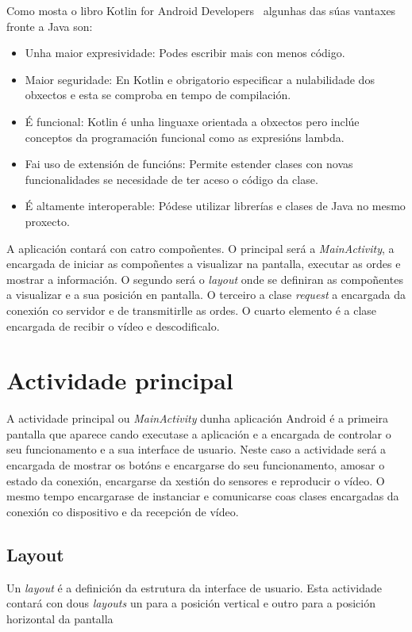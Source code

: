 Como mosta o libro Kotlin for Android Developers~\cite{leivaKotlinAndroidDevelopers2018} algunhas das súas vantaxes fronte a Java son:
\begin{itemize}
    \item Unha maior expresividade: Podes escribir mais con menos código.
    \item Maior seguridade: En Kotlin e obrigatorio especificar a nulabilidade dos obxectos e esta se comproba en tempo de compilación.
    \item É funcional: Kotlin é unha linguaxe orientada a obxectos pero inclúe conceptos da programación funcional como as expresións lambda.
    \item Fai uso de extensión de funcións: Permite estender clases con novas funcionalidades se necesidade de ter aceso o código da clase.
    \item É altamente interoperable: Pódese utilizar librerías e clases de Java no mesmo proxecto.
\end{itemize}


A aplicación contará con catro compoñentes. O principal será a \emph{MainActivity}, a encargada de iniciar as compoñentes a visualizar na pantalla, executar as ordes e mostrar a información. O segundo será o \emph{layout} onde se definiran as compoñentes a visualizar e a sua posición en pantalla. O terceiro a clase \emph{request} a encargada da conexión co servidor e de transmitirlle as ordes. O cuarto elemento é a clase encargada de recibir o vídeo e descodificalo.

\section{Actividade principal}
A actividade principal ou \emph{MainActivity} dunha aplicación Android é a primeira pantalla que aparece cando executase a aplicación e a encargada de controlar o seu funcionamento e a sua interface de usuario. Neste caso a actividade será a encargada de mostrar os botóns e encargarse do seu funcionamento, amosar o estado da conexión, encargarse da xestión do sensores e reproducir o vídeo. O mesmo tempo encargarase de instanciar e comunicarse coas clases encargadas da conexión co dispositivo e da recepción de vídeo.

\subsection{Layout}
Un \emph{layout} é a definición da estrutura da interface de usuario. Esta actividade contará con dous \emph{layouts} un para a posición vertical e outro para a posición horizontal da pantalla
